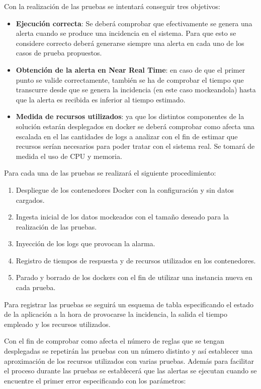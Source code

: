 Con la realización de las pruebas se intentará conseguir tres objetivos:

\begin{itemize}


	\item \textbf{Ejecución correcta}: Se deberá comprobar que efectivamente se genera una alerta cuando se produce una incidencia en el sistema. Para que esto se considere correcto deberá generarse siempre una alerta en cada uno de los casos de prueba propuestos.

	\item \textbf{Obtención de la alerta en Near Real Time}: en caso de que el primer punto se valide correctamente, también se ha de comprobar el tiempo que transcurre desde que se genera la incidencia (en este caso mockeandola) hasta que la alerta es recibida es inferior al tiempo estimado.

	\item \textbf{Medida de recursos utilizados}: ya que los distintos componentes de la solución estarán desplegados en docker se deberá comprobar como afecta una escalada en el las cantidades de logs a analizar con el fin de estimar que recursos serían necesarios para poder tratar con el sistema real. Se tomará de medida el uso de CPU y memoria.

\end{itemize}

Para cada una de las pruebas se realizará el siguiente procedimiento:
\begin{enumerate}
	\item Despliegue de los contenedores Docker con la configuración y sin datos cargados.
	\item Ingesta inicial de los datos mockeados con el tamaño deseado para la realización de las pruebas.
	\item Inyección de los logs que provocan la alarma.
	\item Registro de tiempos de respuesta y de recursos utilizados en los contenedores.
	\item Parado y borrado de los dockers con el fin de utilizar una instancia nueva en cada prueba.
\end{enumerate}

Para registrar las pruebas se seguirá un esquema de tabla especificando el estado de la aplicación a la hora de provocarse  la incidencia, la salida el tiempo empleado y los recursos utilizados.

Con el fin de comprobar como afecta el número de reglas que se tengan desplegadas se repetirán las pruebas con un número distinto y así establecer una aproximación de los recursos utilizados con varias pruebas. Además para facilitar el proceso durante las pruebas se establecerá que las alertas se ejecutan cuando se encuentre el primer error especificando con los parámetros:


